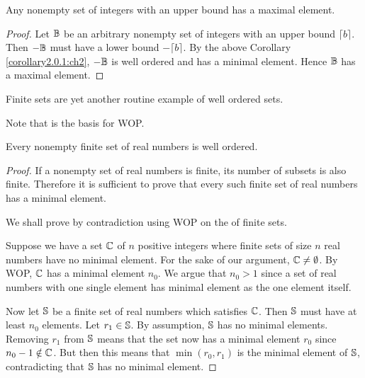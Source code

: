 \begin{cor}
    Any nonempty set of integers with an upper bound has a maximal element.
\end{cor}

\begin{proof} \label{corollary2.0.2:ch2}
    Let $\mathbb{B}$ be an arbitrary nonempty set of integers with an upper
    bound $\lceil b \rceil$. Then $-\mathbb{B}$ must have a lower bound $-\lceil b \rceil$.
    By the above Corollary \ref{corollary2.0.1:ch2}, $-\mathbb{B}$ is well ordered and has
    a minimal element. Hence $\mathbb{B}$ has a maximal element.
\end{proof}

Finite sets are yet another routine example of well ordered sets.

\begin{ab}
    Note that  is the basis for WOP.
\end{ab}

\begin{lemNotes}
    Every nonempty finite set of real numbers is well ordered.
\end{lemNotes}

\begin{proof}
    If a nonempty set of real numbers is finite, its number of subsets is also finite.
    Therefore it is sufficient to prove that every such finite set of real numbers has a minimal element.

    We shall prove by contradiction using WOP on the  of finite sets.

    Suppose we have a set $\mathbb{C}$ of $n$ positive integers where finite
    sets of size $n$ real numbers have no minimal element. For the sake of our argument,
    $\mathbb{C} \neq \emptyset$. By WOP, $\mathbb{C}$ has a minimal element $n_0$. We argue
    that $n_0 > 1$ since a set of real numbers with one single element has
    minimal element as the one element itself.

    Now let $\mathbb{S}$ be a finite set of real numbers which satisfies
    $\mathbb{C}$. Then $\mathbb{S}$ must have at least $n_0$ elements. Let $r_1 \in \mathbb{S}$.
    By assumption, $\mathbb{S}$ has no minimal elements. Removing $r_1$ from $\mathbb{S}$
    means that the set now has a minimal element $r_0$ since $n_0 - 1 \notin \mathbb{C}$.
    But then this means that $\min(r_0, r_1)$ is the minimal element of $\mathbb{S}$,
    contradicting that $\mathbb{S}$ has no minimal element.
\end{proof}
